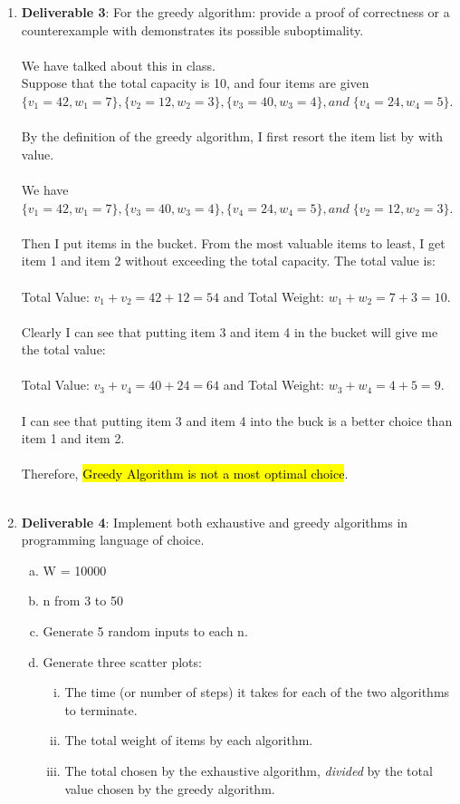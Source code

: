 \documentclass[11pt]{article}
\begin{document}
\begin{enumerate}
	\item
	\textbf{Deliverable 3}: For the greedy algorithm: provide a proof of correctness or a counterexample with demonstrates
	 its possible suboptimality. \\\\
	We have talked about this in class. \\
	Suppose that the total capacity is 10, and four items are given $\{v_1 = 42, w_1 = 7\}, \{v_2 = 12, w_2 = 3\}, \{v_3 = 40, w_3 = 4\}, and \; \{v_4 = 24, w_4 = 5\}$. \\\\
	By the definition of the greedy algorithm, I first resort the item list by with value. \\\\
	We have $\{v_1 = 42, w_1 = 7\}, \{v_3 = 40, w_3 = 4\}, \{v_4 = 24, w_4 = 5\}, and \; \{v_2 = 12, w_2 = 3\}$. \\\\
	Then I put items in the bucket. From the most valuable items to least, I get item 1 and item 
	 2 without exceeding the total capacity. The total value is:\\\\
	 Total Value: $v_1+v_2=42+12=54$ and Total Weight: $w_1+w_2=7+3=10$. \\\\
	Clearly I can see that putting item 3 and item 4 in the bucket will give me the total value: \\\\
	Total Value: $v_3+v_4=40+24=64$ and Total Weight: $w_3+w_4=4+5=9$. \\\\
	I can see that putting item 3 and item 4 into the buck is a better choice than item 1 and item 2. \\\\
	Therefore, \hl{Greedy Algorithm is not a most optimal choice}.\\\\

	\item
	\textbf{Deliverable 4}: Implement both exhaustive and greedy algorithms in programming language of choice.
	\begin{enumerate}[(a)]
	\item W = 10000
	\item n from 3 to 50
	\item Generate 5 random inputs to each n.
	\item Generate three scatter plots:
		\begin{enumerate}[(i)]
		\item The time (or number of steps) it takes for each of the two algorithms to terminate.
		\item The total weight of items by each algorithm.
		\item The total chosen by the exhaustive algorithm, \textit{divided} by the total value chosen by the greedy algorithm.
		\end{enumerate}
	\end{enumerate}
	

\end{enumerate}
\end{document}
